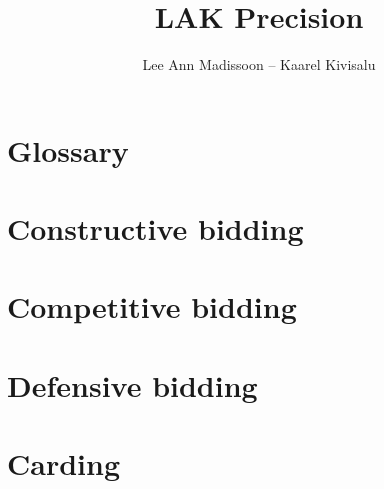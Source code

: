 \documentclass[11pt]{report}
\title{LAK Precision}
\author{Lee Ann Madissoon -- Kaarel Kivisalu}
\begin{document}
\maketitle
\tableofcontents


\chapter*{Glossary}


\chapter{Constructive bidding}














\chapter{Competitive bidding}


\chapter{Defensive bidding}


\chapter{Carding}

\end{document}
